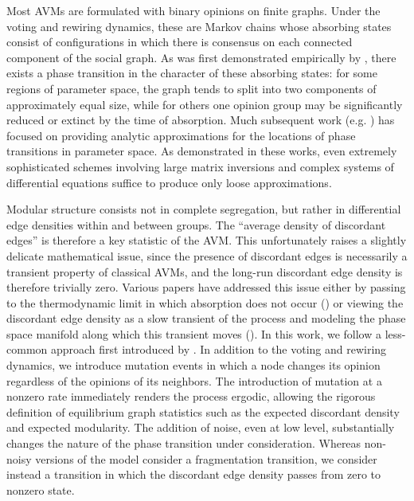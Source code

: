 \documentclass[english]{scrartcl}
\begin{document}
	Most AVMs are formulated with binary opinions on finite graphs. 
	Under the voting and rewiring dynamics, these are Markov chains whose absorbing states consist of configurations in which there is consensus on each connected component of the social graph. 
	As was first demonstrated empirically by \cite{Holme2006}, there exists a phase transition in the character of these absorbing states: for some regions of parameter space, the graph tends to split into two components of approximately equal size, while for others one opinion group may be significantly reduced or extinct by the time of absorption. 
	Much subsequent work (e.g. \cite{Demirel2012,Bohme2011,Durrett2012,Kimura2008}) has focused on providing analytic approximations for the locations of phase transitions in parameter space. 
	As demonstrated in these works, even extremely sophisticated schemes involving large matrix inversions and complex systems of differential equations suffice to produce only loose approximations. 

	Modular structure consists not in complete segregation, but rather in differential edge densities within and between groups. 
	The ``average density of discordant edges'' is therefore a key statistic of the AVM. 
	This unfortunately raises a slightly delicate mathematical issue, since the presence of discordant edges is necessarily a transient property of classical AVMs, and the long-run discordant edge density is therefore trivially zero. 
	Various papers have addressed this issue either by passing to the thermodynamic limit in which absorption does not occur (\cite{Silk2014,Demirel2012}) or viewing the discordant edge density as a slow transient of the process and modeling the phase space manifold along which this transient moves (\cite{Durrett2012}).
	In this work, we follow a less-common approach first introduced by \cite{Ji2013}.
	In addition to the voting and rewiring dynamics, we introduce mutation events in which a node changes its opinion regardless of the opinions of its neighbors. 
	The introduction of mutation at a nonzero rate immediately renders the process ergodic, allowing the rigorous definition of equilibrium graph statistics such as the expected discordant density and expected modularity. 
	The addition of noise, even at low level, substantially changes the nature of the phase transition under consideration. 
	Whereas non-noisy versions of the model consider a fragmentation transition, we consider instead a transition in which the discordant edge density passes from zero to nonzero state. 
\end{document}
